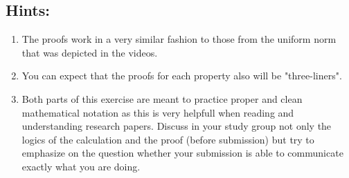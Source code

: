 \documentclass{WeSTassignment}
\begin{document}
\subsection{Hints:}
\begin{enumerate}
\item The proofs work in a very similar fashion to those from the uniform norm that was depicted in the videos. 

\item You can expect that the proofs for each property also will be "three-liners".

\item Both parts of this exercise are meant to practice proper and clean mathematical notation as this is very helpfull when reading and understanding research papers. Discuss in your study group not only the logics of the calculation and the proof (before submission) but try to emphasize on the question whether your submission is able to communicate exactly what you are doing. 

\end{enumerate}
\end{document}
